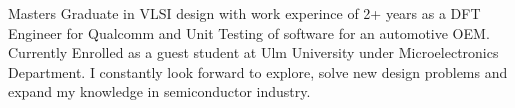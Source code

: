 

\begin{cvparagraph}

Masters Graduate in VLSI design with work experince of 2+ years as a DFT Engineer for Qualcomm and Unit Testing of software for an automotive OEM. Currently Enrolled as a guest student at Ulm University under Microelectronics Department. I constantly look forward to explore, solve new design problems and expand my knowledge in semiconductor industry.
\end{cvparagraph}

